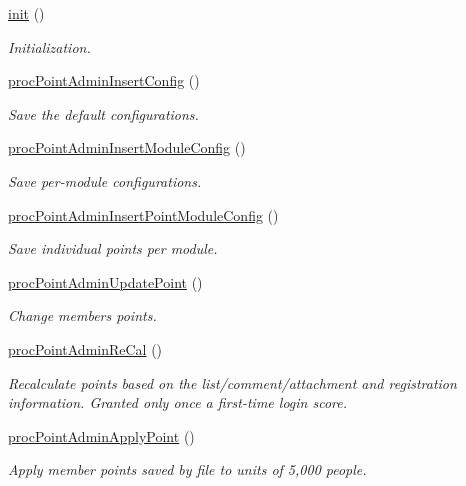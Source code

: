 \begin{DoxyCompactItemize}
\item 
\hyperlink{classpointAdminController_a739b139aeeef70cf164f5e21dccec06a}{init} ()
\begin{DoxyCompactList}\small\item\em Initialization. \end{DoxyCompactList}\item 
\hyperlink{classpointAdminController_a57b75694a363d0c8dc6d46ffce1ce25d}{proc\+Point\+Admin\+Insert\+Config} ()
\begin{DoxyCompactList}\small\item\em Save the default configurations. \end{DoxyCompactList}\item 
\hyperlink{classpointAdminController_a8358535932ea77e28e3510b4f42d1083}{proc\+Point\+Admin\+Insert\+Module\+Config} ()
\begin{DoxyCompactList}\small\item\em Save per-\/module configurations. \end{DoxyCompactList}\item 
\hyperlink{classpointAdminController_a54aeea5eae9769da55bd85159a41501a}{proc\+Point\+Admin\+Insert\+Point\+Module\+Config} ()
\begin{DoxyCompactList}\small\item\em Save individual points per module. \end{DoxyCompactList}\item 
\hyperlink{classpointAdminController_a2d90c166719dee56dbee47b7aa5eb30d}{proc\+Point\+Admin\+Update\+Point} ()
\begin{DoxyCompactList}\small\item\em Change members points. \end{DoxyCompactList}\item 
\hyperlink{classpointAdminController_a0932223bc8b3441dcfff013c6050ee89}{proc\+Point\+Admin\+Re\+Cal} ()
\begin{DoxyCompactList}\small\item\em Recalculate points based on the list/comment/attachment and registration information. Granted only once a first-\/time login score. \end{DoxyCompactList}\item 
\hyperlink{classpointAdminController_ade85d4289b954ca0c0caadafeb4c115c}{proc\+Point\+Admin\+Apply\+Point} ()
\begin{DoxyCompactList}\small\item\em Apply member points saved by file to units of 5,000 people. \end{DoxyCompactList}\item 

\end{DoxyCompactItemize}

